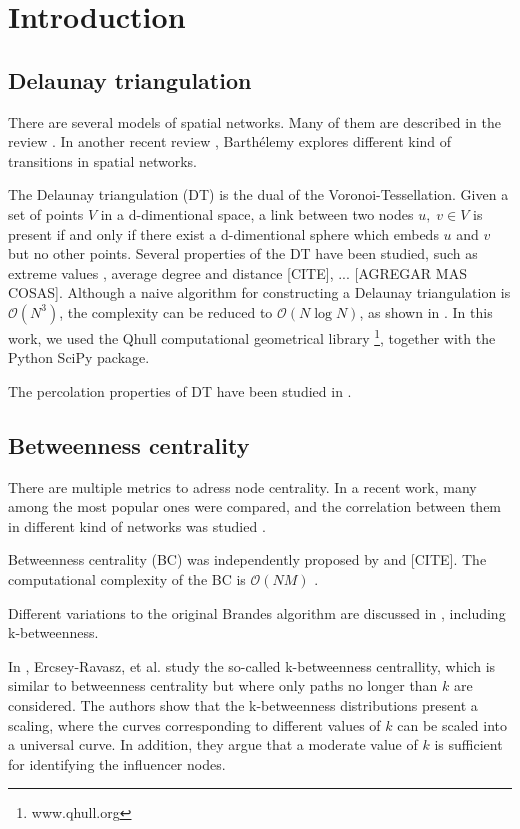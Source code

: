 \documentclass{article}
\begin{document}
\section{Introduction}

\subsection{Delaunay triangulation}

There are several models of spatial networks. Many of them are described in the review \cite{Barthelemy2011}. In another recent review \cite{Barthelemy2018}, Barth\'elemy explores different kind of transitions in spatial networks.

The Delaunay triangulation (DT) is the dual of the Voronoi-Tessellation. Given a set of points $V$ in a d-dimentional space, a link between two nodes $u,\;v\in V$ is present if and only if there exist a d-dimentional sphere which embeds $u$ and $v$ but no other points. Several properties of the DT have been studied, such as extreme values \cite{Lee1980}, average degree and distance [CITE], ... [AGREGAR MAS COSAS]. Although a naive algorithm for constructing a Delaunay triangulation is $\mathcal{O}(N^3)$, the complexity can be reduced to $\mathcal{O}(N\log N)$, as shown in \cite{Lee1980}. In this work, we used the Qhull computational geometrical library \footnote{www.qhull.org}, together with the Python SciPy package.

The percolation properties of DT have been studied in \cite{Becker2009,Alencar2020}.


\subsection{Betweenness centrality}

There are multiple metrics to adress node centrality. In a recent work, many among the most popular ones were compared, and the correlation between them in different kind of networks was studied \cite{Oldham2019}.

Betweenness centrality (BC) was independently proposed by \cite{Freeman1977ABetweenness} and [CITE]. The computational complexity of the BC is $\mathcal{O}(NM)$ \cite{Brandes2001ACentrality}.

Different variations to the original Brandes algorithm are discussed in \cite{Brandes2008}, including k-betweenness.

In \cite{Ercsey-Ravasz2010,Ercsey-Ravasz2012}, Ercsey-Ravasz, et al. study the so-called k-betweenness centrallity, which is similar to betweenness centrality but where only paths no longer than $k$ are considered. The authors show that the k-betweenness distributions present a scaling, where the curves corresponding to different values of $k$ can be scaled into a universal curve. In addition, they argue that a moderate value of $k$ is sufficient for identifying the influencer nodes. 
\end{document}
